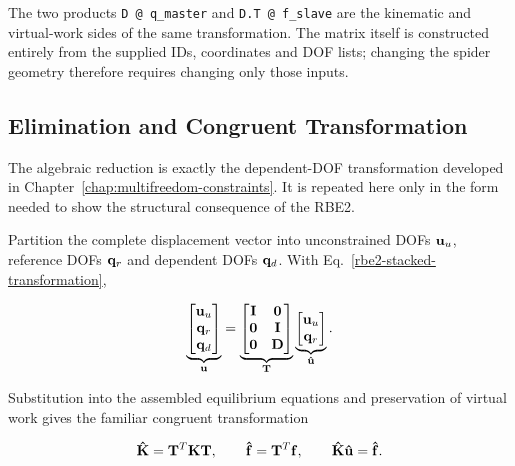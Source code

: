 The two products \texttt{D @ q\_master} and \texttt{D.T @ f\_slave} are the
kinematic and virtual-work sides of the same transformation. The matrix itself
is constructed entirely from the supplied IDs, coordinates and DOF lists;
changing the spider geometry therefore requires changing only those inputs.

\subsection{Elimination and Congruent Transformation}

The algebraic reduction is exactly the dependent-DOF transformation developed in
Chapter~\ref{chap:multifreedom-constraints}. It is repeated here only in the form
needed to show the structural consequence of the RBE2.

Partition the complete displacement vector into unconstrained DOFs $\mathbf{u}_u$,
reference DOFs $\mathbf{q}_r$ and dependent DOFs $\mathbf{q}_d$. With
Eq.~\eqref{rbe2-stacked-transformation},

\begin{equation}\label{rbe2-global-transformation}
    \underbrace{
    \begin{bmatrix}
        \mathbf{u}_u\\
        \mathbf{q}_r\\
        \mathbf{q}_d
    \end{bmatrix}}_{\mathbf{u}}
    =
    \underbrace{
    \begin{bmatrix}
        \mathbf{I}&\mathbf{0}\\
        \mathbf{0}&\mathbf{I}\\
        \mathbf{0}&\mathbf{D}
    \end{bmatrix}}_{\mathbf{T}}
    \underbrace{
    \begin{bmatrix}
        \mathbf{u}_u\\
        \mathbf{q}_r
    \end{bmatrix}}_{\mathbf{\hat{u}}}.
\end{equation}

Substitution into the assembled equilibrium equations and preservation of virtual
work gives the familiar congruent transformation

\begin{bbox}[0.88]
\begin{equation}\label{rbe2-congruent-transformation}
    \mathbf{\hat{K}}=\mathbf{T}^{T}\mathbf{K}\mathbf{T},
    \qquad
    \mathbf{\hat{f}}=\mathbf{T}^{T}\mathbf{f},
    \qquad
    \mathbf{\hat{K}}\mathbf{\hat{u}}=\mathbf{\hat{f}}.
\end{equation}
\end{bbox}

